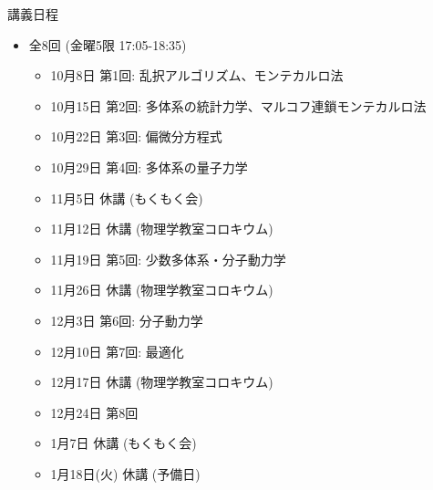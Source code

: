 \begin{frame}[t]{講義日程}
  \begin{itemize}
  \item 全8回 (金曜5限 {\color{red}17:05}-18:35)
    \begin{itemize}
    \item {\color{gray} 10月8日 第1回: 乱択アルゴリズム、モンテカルロ法}
    \item {\color{gray} 10月15日 第2回: 多体系の統計力学、マルコフ連鎖モンテカルロ法}
    \item {\color{gray} 10月22日 第3回: 偏微分方程式}
    \item {\color{gray} 10月29日 第4回: 多体系の量子力学}
    \item {\color{gray} 11月5日 休講 (もくもく会)}
    \item {\color{gray} 11月12日 休講 (物理学教室コロキウム)}
    \item 11月19日 第5回: 少数多体系・分子動力学
    \item {\color{gray} 11月26日 休講 (物理学教室コロキウム)}
    \item 12月3日 第6回: 分子動力学
    \item 12月10日 第7回: 最適化
    \item {\color{gray} 12月17日 休講 (物理学教室コロキウム)}
    \item 12月24日 第8回
    \item 1月7日 休講 (もくもく会)
    \item {\color{gray} 1月18日(火) 休講 (予備日)}
    \end{itemize}
  \end{itemize}
\end{frame}

